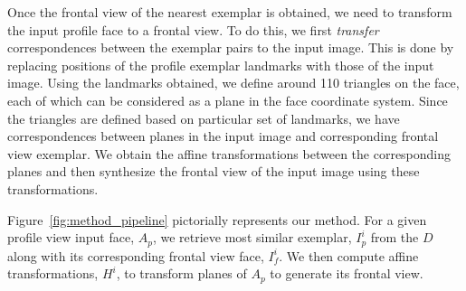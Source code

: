 Once the frontal view of the nearest exemplar is obtained, we need to transform the input profile
face to a frontal view. To do this, we first \emph{transfer} correspondences between the exemplar
pairs to the input image. This is done by replacing positions of the profile exemplar landmarks with
those of the input image.
Using the landmarks
obtained, we define around 110 triangles on the face, each of which can be considered as a plane in
the face coordinate system. Since the triangles are defined based on particular set of landmarks, we
have correspondences between planes in the input image and corresponding frontal view
exemplar. We obtain the affine transformations between the corresponding planes and  
then synthesize the frontal view of the input image using these transformations.

 Figure~\ref{fig:method_pipeline} pictorially represents our method. 
For a given profile view input face, $A_p$, we retrieve most similar exemplar, $I^i_p$ from the $D$
along with its corresponding frontal view face, $I^i_f$. We then compute affine
transformations, $H^i$, to transform planes of $A_p$ to generate its frontal view.
